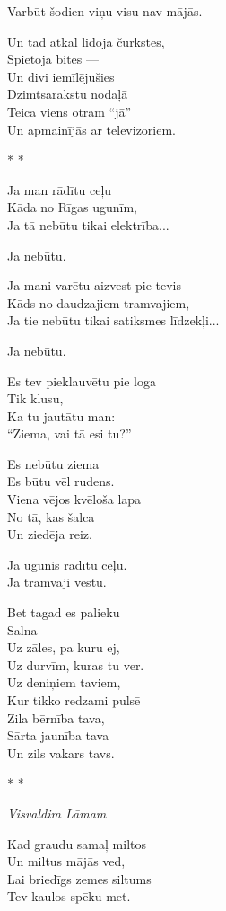 \documentclass[14pt]{extarticle}
\begin{document}
Varbūt šodien viņu visu nav mājās.

Un tad atkal lidoja čurkstes,\\
Spietoja bites ---\\
Un divi iemīlējušies\\
Dzimtsarakstu nodaļā\\
Teica viens otram ``jā''\\
Un apmainījās ar televizoriem.


\newpage

{\large \sc * * *}

Ja man rādītu ceļu\\
Kāda no Rīgas ugunīm,\\
Ja tā nebūtu tikai elektrība...

Ja nebūtu.

Ja mani varētu aizvest pie tevis\\
Kāds no daudzajiem tramvajiem,\\
Ja tie nebūtu tikai satiksmes līdzekļi...

Ja nebūtu.

Es tev pieklauvētu pie loga\\
Tik klusu,\\
Ka tu jautātu man:\\
``Ziema, vai tā esi tu?''

Es nebūtu ziema\\
Es būtu vēl rudens.\\
Viena vējos kvēloša lapa\\
No tā, kas šalca\\
Un ziedēja reiz.

Ja ugunis rādītu ceļu.\\
Ja tramvaji vestu.

Bet tagad es palieku\\
Salna\\
Uz zāles, pa kuru ej,\\
Uz durvīm, kuras tu ver.\\
Uz deniņiem taviem,\\
Kur tikko redzami pulsē\\
Zila bērnība tava,\\
Sārta jaunība tava\\
Un zils vakars tavs.


\newpage

{\large \sc * * *}

{\em Visvaldim Lāmam}

Kad graudu samaļ miltos\\
Un miltus mājās ved,\\
Lai briedīgs zemes siltums\\
Tev kaulos spēku met.
\end{document}
